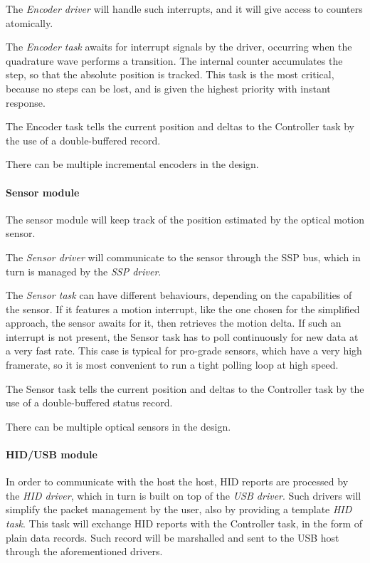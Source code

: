 \documentclass[a4paper,10pt]{article}
\begin{document}
\begin{multicols}{2}
The \emph{Encoder driver} will handle such interrupts, and it will give access
to counters atomically.

The \emph{Encoder task} awaits for interrupt signals by the driver, occurring
when the quadrature wave performs a transition. The internal counter
accumulates the step, so that the absolute position is tracked. This task is
the most critical, because no steps can be lost, and is given the highest
priority with instant response.

The Encoder task tells the current position and deltas to the Controller task
by the use of a double-buffered record.

There can be multiple incremental encoders in the design.


\paragraph{Sensor module}
The sensor module will keep track of the position estimated by the optical
motion sensor.

The \emph{Sensor driver} will communicate to the sensor through the SSP bus,
which in turn is managed by the \emph{SSP driver}.

The \emph{Sensor task} can have different behaviours, depending on the
capabilities of the sensor. If it features a motion interrupt, like the one
chosen for the simplified approach, the sensor awaits for it, then retrieves
the motion delta. If such an interrupt is not present, the Sensor task has to
poll continuously for new data at a very fast rate. This case is typical for
pro-grade sensors, which have a very high framerate, so it is most convenient
to run a tight polling loop at high speed.

The Sensor task tells the current position and deltas to the Controller task
by the use of a double-buffered status record.

There can be multiple optical sensors in the design.


\paragraph{HID/USB module}
In order to communicate with the host the host, HID reports are processed by
the \emph{HID driver}, which in turn is built on top of the \emph{USB driver}.
Such drivers will simplify the packet management by the user, also by
providing a template \emph{HID task}. This task will exchange HID reports
with the Controller task, in the form of plain data records. Such record will
be marshalled and sent to the USB host through the aforementioned drivers.


\end{multicols}
\end{document}
